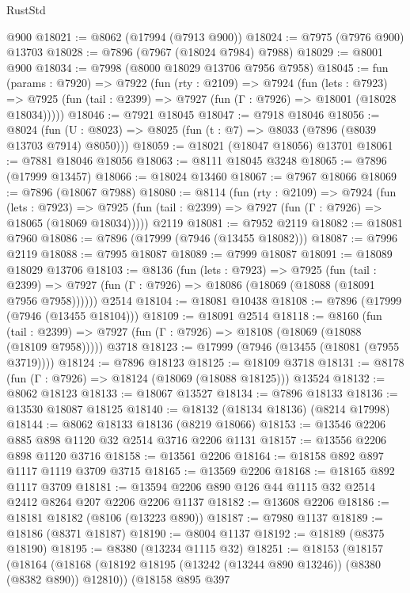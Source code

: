 \begin{lexlean}{RustStd}
\begin{coremodule}
    @900
@18021 := @8062 (@17994 (@7913 @900))
@18024 := @7975 (@7976 @900) @13703
@18028 := @7896 (@7967 (@18024 @7984) @7988)
@18029 := @8001 @900
@18034 := @7998 (@8000 @18029 @13706 @7956 @7958)
@18045 := fun (params : @7920) =>
  @7922
    (fun (rty : @2109) =>
    @7924
      (fun (lets : @7923) =>
      @7925 (fun (tail : @2399) => @7927 (fun (Γ : @7926) => @18001 (@18028 @18034)))))
@18046 := @7921 @18045
@18047 := @7918 @18046
@18056 := @8024
    (fun (U : @8023) => @8025 (fun (t : @7) => @8033 (@7896 (@8039 @13703 @7914) @8050)))
@18059 := @18021 (@18047 @18056) @13701
@18061 := @7881 @18046 @18056
@18063 := @8111 @18045 @3248
@18065 := @7896 (@17999 @13457)
@18066 := @18024 @13460
@18067 := @7967 @18066
@18069 := @7896 (@18067 @7988)
@18080 := @8114
    (fun (rty : @2109) =>
    @7924
      (fun (lets : @7923) =>
      @7925 (fun (tail : @2399) => @7927 (fun (Γ : @7926) => @18065 (@18069 @18034)))))
    @2119
@18081 := @7952 @2119
@18082 := @18081 @7960
@18086 := @7896 (@17999 (@7946 (@13455 @18082)))
@18087 := @7996 @2119
@18088 := @7995 @18087
@18089 := @7999 @18087
@18091 := @18089 @18029 @13706
@18103 := @8136
    (fun (lets : @7923) =>
    @7925
      (fun (tail : @2399) =>
      @7927 (fun (Γ : @7926) => @18086 (@18069 (@18088 (@18091 @7956 @7958))))))
    @2514
@18104 := @18081 @10438
@18108 := @7896 (@17999 (@7946 (@13455 @18104)))
@18109 := @18091 @2514
@18118 := @8160
    (fun (tail : @2399) => @7927 (fun (Γ : @7926) => @18108 (@18069 (@18088 (@18109 @7958)))))
    @3718
@18123 := @17999 (@7946 (@13455 (@18081 (@7955 @3719))))
@18124 := @7896 @18123
@18125 := @18109 @3718
@18131 := @8178 (fun (Γ : @7926) => @18124 (@18069 (@18088 @18125))) @13524
@18132 := @8062 @18123
@18133 := @18067 @13527
@18134 := @7896 @18133
@18136 := @13530 @18087 @18125
@18140 := @18132 (@18134 @18136) (@8214 @17998)
@18144 := @8062 @18133 @18136 (@8219 @18066)
@18153 := @13546 @2206 @885 @898 @1120 @32 @2514 @3716 @2206 @1131
@18157 := @13556 @2206 @898 @1120 @3716
@18158 := @13561 @2206
@18164 := @18158 @892 @897 @1117 @1119 @3709 @3715
@18165 := @13569 @2206
@18168 := @18165 @892 @1117 @3709
@18181 := @13594 @2206 @890 @126 @44 @1115 @32 @2514 @2412 @8264 @207 @2206 @2206 @1137
@18182 := @13608 @2206
@18186 := @18181 @18182 (@8106 (@13223 @890))
@18187 := @7980 @1137
@18189 := @18186 (@8371 @18187)
@18190 := @8004 @1137
@18192 := @18189 (@8375 @18190)
@18195 := @8380 (@13234 @1115 @32)
@18251 := @18153
    (@18157
      (@18164
        (@18168 (@18192 @18195 (@13242 (@13244 @890 @13246)) (@8380 (@8382 @890)) @12810))
        (@18158
          @895
          @397

\end{coremodule}
\end{lexlean}
